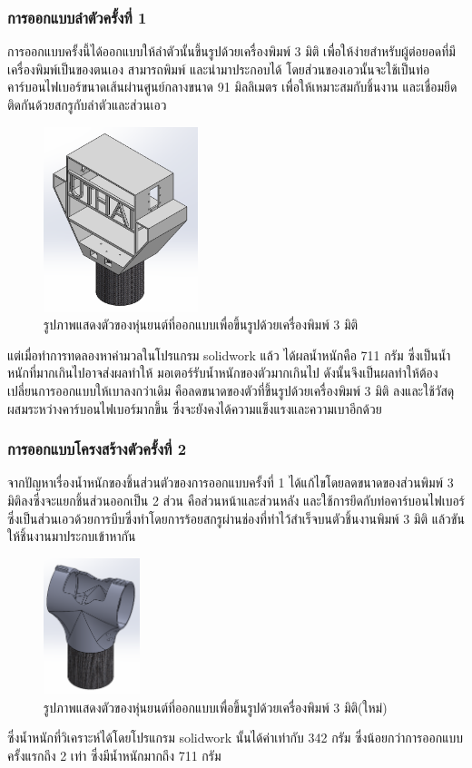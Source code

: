 \subsubsection{การออกแบบลำตัวครั้งที่ 1}
การออกแบบครั้งนี้ได้ออกแบบให้ลำตัวนั้นขึ้นรูปด้วยเครื่องพิมพ์ 3 มิติ เพื่อให้ง่ายสำหรับผู้ต่อยอดที่มีเครื่องพิมพ์เป็นของตนเอง สามารถพิมพ์
และนำมาประกอบได้ โดยส่วนของเอวนั้นจะใช้เป็นท่อคาร์บอนไฟเบอร์ขนาดเส้นผ่านศูนย์กลางขนาด 91 มิลลิเมตร เพื่อให้เหมาะสมกับชิ้นงาน
และเชื่อมยึดติดกันด้วยสกรูกับลำตัวและส่วนเอว
\begin{figure}[!ht]
  \centering
  \includegraphics[width=0.4\textwidth]{chapter4/images/troso_old.PNG}
  \caption{รูปภาพแสดงตัวของหุ่นยนต์ที่ออกแบบเพื่อขึ้นรูปด้วยเครื่องพิมพ์ 3 มิติ}
  \label{fig:torso_old}
\end{figure}

แต่เมื่อทำการทดลองหาค่ามวลในโปรแกรม solidwork แล้ว ได้ผลน้ำหนักคือ 711 กรัม ซึ่งเป็นน้ำหนักที่มากเกินไปอาจส่งผลทำให้
มอเตอร์รับน้ำหนักของตัวมากเกินไป ดังนั้นจึงเป็นผลทำให้ต้องเปลี่ยนการออกแบบให้เบาลงกว่าเดิม คือลดขนาดของตัวที่ขึ้นรูปด้วยเครื่องพิมพ์ 3 มิติ
ลงและใช้วัสดุผสมระหว่างคาร์บอนไฟเบอร์มากขึ้น ซึ่งจะยังคงได้ความแข็งแรงและความเบาอีกด้วย

\clearpage
\subsubsection{การออกแบบโครงสร้างตัวครั้งที่ 2}
จากปัญหาเรื่องน้ำหนักของชิ้นส่วนตัวของการออกแบบครั้งที่ 1 ได้แก้ไขโดยลดขนาดของส่วนพิมพ์ 3 มิติลงซึ่งจะแยกชิ้นส่วนออกเป็น 2 ส่วน คือส่วนหน้าและส่วนหลัง
และใช้การยึดกับท่อคาร์บอนไฟเบอร์ซึ่งเป็นส่วนเอวด้วยการบีบซึ่งทำโดยการร้อยสกรูผ่านช่องที่ทำไว้สำเร็จบนตัวชิ้นงานพิมพ์ 3 มิติ แล้วขันให้ชิ้นงานมาประกบเข้าหากัน
\begin{figure}[!ht]
  \centering
  \includegraphics[width=0.25\textwidth]{chapter4/images/troso_new.PNG}
  \caption{รูปภาพแสดงตัวของหุ่นยนต์ที่ออกแบบเพื่อขึ้นรูปด้วยเครื่องพิมพ์ 3 มิติ(ใหม่)}
  \label{fig:torso_new}
\end{figure}
ซึ่งน้ำหนักที่วิเคราะห์ได้โดยโปรแกรม solidwork นั้นได้ค่าเท่ากับ 342 กรัม ซึ่งน้อยกว่าการออกแบบครั้งแรกถึง 2 เท่า ซึ่งมีน้ำหนักมากถึง 711 กรัม

